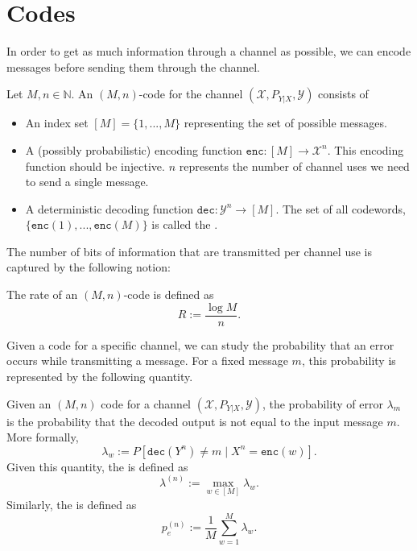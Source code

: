\section{Codes}
In order to get as much information through a channel as possible, we can encode messages before sending them through the channel.

\begin{definition}[Code]\label{def:code}
Let $M, n \in \mathbb{N}$. An $(M,n)$-code for the channel $(\mathcal{X},P_{Y|X},\mathcal{Y})$ consists of
\begin{itemize}
\item An index set $[M] = \{1, ..., M\}$ representing the set of possible messages.
\item A (possibly probabilistic) encoding function $\mathtt{enc} :[M] \to \mathcal{X}^n$. This encoding function should be injective. $n$ represents the number of channel uses we need to send a single message.
\item A deterministic decoding function $\mathtt{dec} : \mathcal{Y}^n \to [M]$.
The set of all codewords, $\{\mathtt{enc}(1), ..., \mathtt{enc}(M)\}$ is called the .
\end{itemize}
\end{definition}

\noindent The number of bits of information that are transmitted per channel use is captured by the following notion:

\begin{definition}[Rate]
The rate of an $(M,n)$-code is defined as
\[
R := \frac{\log M}{n}.
\]
\end{definition}

Given a code for a specific channel, we can study the probability that an error occurs while transmitting a message. For a fixed message $m$, this probability is represented by the following quantity.

\begin{definition}
Given an $(M,n)$ code for a channel $(\mathcal{X},P_{Y|X},\mathcal{Y})$, the probability of error $\lambda_m$ is the probability that the decoded output is not equal to the input message $m$. More formally,
\[
\lambda_w := P[\mathtt{dec}(Y^n) \neq m \mid X^n = \mathtt{enc}(w)].
\]
Given this quantity, the  is defined as 
\[\lambda^{(n)} := \max_{w \in [M]} \lambda_w.\]
Similarly, the  is defined as
\[
p_e^{(n)} := \frac{1}{M} \sum_{w=1}^M \lambda_w.
\]
\end{definition}

